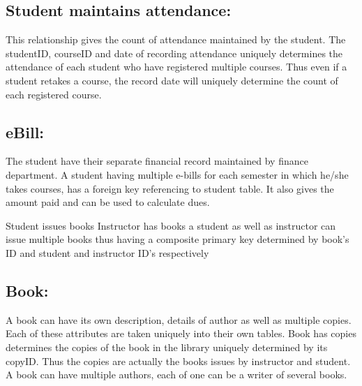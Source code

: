 \documentclass[12pt,letterpaper]{article}
\begin{document}
\subsection{Student maintains attendance:} This relationship gives the count of attendance maintained by the student. The studentID, courseID and date of recording attendance uniquely determines the attendance of each student who have registered multiple courses. Thus even if a student retakes a course, the record date will uniquely determine the count of each registered course. 


\subsection{eBill:} The student have their separate financial record maintained by finance department. A student having multiple e-bills for each semester in which he/she takes courses, has a foreign key referencing to student table. It also gives the amount paid and can be used to calculate dues.

Student issues books Instructor has books a student as well as instructor can issue multiple books thus having a composite primary key determined by book’s ID and student and instructor ID’s respectively

\subsection{Book:} A book can have its own description, details of author as well as multiple copies. Each of these attributes are taken uniquely into their own tables. Book has  copies determines the copies of the book in the library uniquely determined by its copyID. Thus the copies are actually the books issues by instructor and student. A book can have multiple authors, each of one can be a writer of several books. 


	
\end{document}
